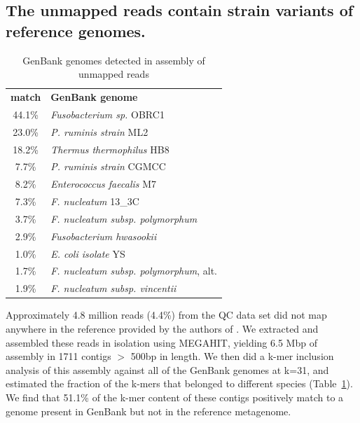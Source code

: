 \documentclass[11pt]{article}
\begin{document}
\subsection*{The unmapped reads contain strain variants of reference genomes.}





\begin{table}[t]
\caption{GenBank genomes detected in assembly of unmapped reads}
\centering
\begin{tabular}{|c|l|}
\hline

\textbf{match}& \textbf{GenBank genome} \\ [0.5ex] %
44.1\% & {\em \small Fusobacterium sp.} OBRC1 \\
\hline
23.0\% & {\em \small P. ruminis strain} ML2 \\
\hline
18.2\% & {\em \small Thermus thermophilus} HB8 \\
\hline
7.7\% & {\em \small P. ruminis strain} CGMCC \\
\hline
8.2\% & {\em \small Enterococcus faecalis} M7 \\
\hline
7.3\% & {\em \small F. nucleatum} 13\_3C  \\
\hline
3.7\% & {\em \small F. nucleatum subsp. polymorphum} \\
\hline
2.9\% & {\em \small Fusobacterium hwasookii} \\
\hline
1.0\% & {\em \small E. coli isolate} YS \\
\hline
1.7\% & {\em \small F. nucleatum subsp. polymorphum}, alt. \\
\hline
1.9\% & {\em \small F. nucleatum subsp. vincentii} \\
\hline

\end{tabular}
\label{table:gather}
\end{table}

Approximately 4.8 million reads (4.4\%) from the QC data set did not
map anywhere in the reference provided by the authors of \cite{podar}.
We extracted and assembled these reads in isolation using MEGAHIT,
yielding 6.5 Mbp of assembly in 1711 contigs $>$ 500bp in length.  We
then did a k-mer inclusion analysis of this assembly against all of
the GenBank genomes at k=31, and estimated the fraction of the k-mers
that belonged to different species (Table~\ref{table:gather}). We find
that 51.1\% of the k-mer content of these contigs positively match to
a genome present in GenBank but not in the reference metagenome.
\end{document}
